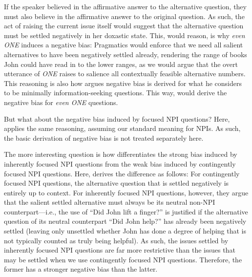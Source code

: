 If the speaker believed in the affirmative answer to the alternative question, they must also believe in the affirmative answer to the original question. As such, the act of raising the current issue itself would suggest that the alternative question must be settled negatively in her doxastic state. This, \textcite{Jeong2021,Jeong2022} would reason, is why \textit{even \MakeUppercase{one}} induces a negative bias: Pragmatics would enforce that we need all salient alternatives to have been negatively settled already, rendering the range of books John could have read in  to the lower ranges, as we would argue that the overt utterance of \textit{ONE} raises to salience all contextually feasible alternative numbers. This reasoning is also how \textcite{vanRooij2003} argues negative bias is derived for what he considers to be minimally information-seeking questions. This way, \textcite{Jeong2021,Jeong2022} would derive the negative bias for \textit{even \MakeUppercase{one}} questions. 

But what about the negative bias induced by focused NPI questions? Here, \textcite{Jeong2021,Jeong2022} applies the same reasoning, assuming our standard meaning for NPIs. As such, the basic derivation of negative bias is not treated separately here. 

The more interesting question is how \textcite{Jeong2021,Jeong2022} differentiates the strong bias induced by inherently focused NPI questions from the weak bias induced by contingently focused NPI questions. Here, \textcite{Jeong2021,Jeong2022} derives the difference as follows: For contingently focused NPI questions, the alternative question that is settled negatively is entirely up to context. For inherently focused NPI questions, however, they argue that the salient settled alternative must always be its neutral non-NPI counterpart---i.e., the use of \enquote{Did John lift a finger?} is justified if the alternative question of its neutral counterpart \enquote{Did John help?} has already been negatively settled (leaving only unsettled whether John has done a degree of helping that is not typically counted as truly being helpful). As such, the issues settled by inherently focused NPI questions are far more restrictive than the issues that may be settled when we use contingently focused NPI questions. Therefore, the former has a stronger negative bias than the latter. 

